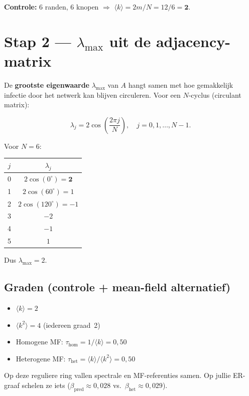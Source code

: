 \documentclass[11pt,a4paper]{article}
\begin{document}
\textbf{Controle:} 6 randen, 6 knopen $\Rightarrow$ $\langle k\rangle = 2m/N = 12/6 = \mathbf{2}$.

\section{Stap 2 --- $\lambda_{\max}$ uit de adjacency-matrix}

De \textbf{grootste eigenwaarde} $\lambda_{\max}$ van $A$ hangt samen met hoe gemakkelijk infectie door het netwerk kan blijven circuleren. Voor een $N$-cyclus (circulant matrix):

\[
\lambda_j = 2\cos\!\left(\frac{2\pi j}{N}\right), \quad j=0,1,\ldots,N-1.
\]

Voor $N=6$:

\begin{center}
\begin{tabular}{@{}cc@{}}
\toprule
$j$ & $\lambda_j$ \\
\midrule
0 & $2\cos(0^\circ) = \mathbf{2}$ \\
1 & $2\cos(60^\circ) = 1$ \\
2 & $2\cos(120^\circ) = -1$ \\
3 & $-2$ \\
4 & $-1$ \\
5 & $1$ \\
\bottomrule
\end{tabular}
\end{center}

Dus \textbf{$\lambda_{\max} = 2$}.

\subsection*{Graden (controle + mean-field alternatief)}

\begin{itemize}[nosep]
  \item $\langle k\rangle = 2$
  \item $\langle k^2\rangle = 4$ (iedereen graad~2)
  \item Homogene MF: $\tau_{\mathrm{hom}} = 1/\langle k\rangle = 0{,}50$
  \item Heterogene MF: $\tau_{\mathrm{het}} = \langle k\rangle/\langle k^2\rangle = 0{,}50$
\end{itemize}

Op deze reguliere ring vallen spectrale en MF-referenties samen. Op jullie ER-graaf schelen ze iets ($\beta_{\mathrm{pred}}{\approx}0{,}028$ vs.\ $\beta_{\mathrm{het}}{\approx}0{,}029$).
\end{document}
